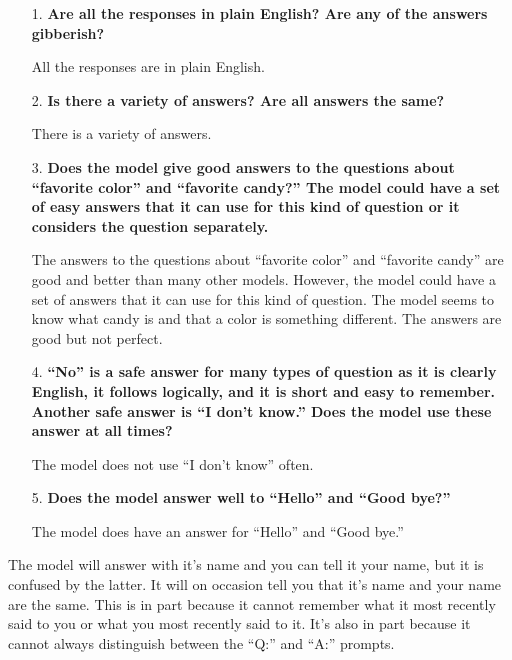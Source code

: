 \begin{itemize}
	\item [1.] \textbf{Are all the responses in plain English? Are any of the answers gibberish?}
	
	\item []All the responses are in plain English. 
	
	\item [2.] \textbf{Is there a  variety of answers? Are all answers the same?}
	
	\item []There is a variety of answers. 
	
	\item [3.] \textbf{Does the model give good answers to the questions about ``favorite color'' and ``favorite candy?'' The model could have a set of easy answers that it can use for this kind of question or it considers the question separately. }
	
	\item []The answers to the questions about ``favorite color'' and ``favorite candy'' are good and better than many other models. However, the model could have a set of answers that it can use for this kind of question. The model seems to know what candy is and that a color is something different. The answers are good but not perfect.
	
	\item [4.] \textbf{``No'' is a safe answer for many types of question as it is clearly English, it follows logically, and it is short and easy to remember. Another safe answer is ``I don't know.'' Does the model use these answer at all times?}
	
	\item []The model does not use ``I don't know'' often. 
	
	\item [5.] \textbf{Does the model answer well to ``Hello'' and ``Good bye?''}
	
	\item []The model does have an answer for ``Hello'' and ``Good bye.''
	
\end{itemize}

The model will answer with it's name and you can tell it your name, but it is confused by the latter. It will on occasion tell you that it's name and your name are the same. This is in part because it cannot remember what it most recently said to you or what you most recently said to it. It's also in part because it cannot always distinguish between the ``Q:'' and ``A:'' prompts.

